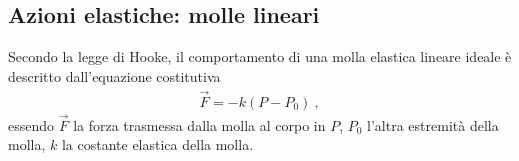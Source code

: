 \documentclass[letterpaper,10pt,italian]{jupyterBook}
\begin{document}
\subsection{Azioni elastiche: molle lineari}
\label{\detokenize{ch/mechanics/actions-examples:azioni-elastiche-molle-lineari}}\label{\detokenize{ch/mechanics/actions-examples:physics-hs-mechanics-actions-spring}}
\sphinxAtStartPar
Secondo la legge di Hooke, il comportamento di una molla elastica lineare ideale è descritto dall’equazione costitutiva
\begin{equation}\label{equation:ch/mechanics/actions-examples:eq:spring}
\begin{split}\vec{F} = - k (P - P_0) \ ,\end{split}
\end{equation}
\sphinxAtStartPar
essendo \(\vec{F}\) la forza trasmessa dalla molla al corpo in \(P\), \(P_0\) l’altra estremità della molla, \(k\) la costante elastica della molla.

\sphinxAtStartPar
{} 



\sphinxAtStartPar
{}
\end{document}
